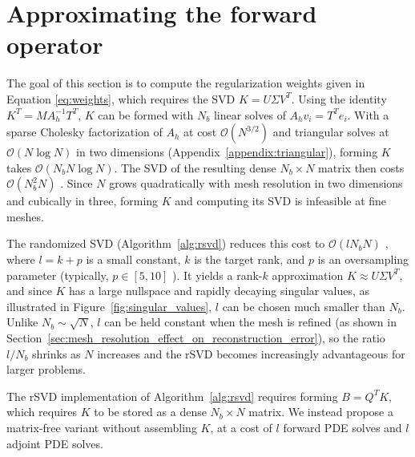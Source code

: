 \section{Approximating the forward operator}\label{sec:approximating}

The goal of this section is to compute the regularization weights given in Equation \eqref{eq:weights}, which requires the SVD $K = U\Sigma V^T$. Using the identity $K^T = MA_h^{-1}T^T$, $K$ can be formed with $N_b$ linear solves of $A_h v_i = T^T e_i$. With a sparse Cholesky factorization of $A_h$ at cost $\mathcal{O}(N^{3/2})$ and triangular solves at $\mathcal{O}(N \log N)$ in two dimensions (Appendix~\ref{appendix:triangular}), forming $K$ takes $\mathcal{O}(N_b N \log N)$. The SVD of the resulting dense $N_b \times N$ matrix then costs $\mathcal{O}(N_b^2 N)$ \cite{dongarraSingularValueDecomposition2018}. Since $N$ grows quadratically with mesh resolution in two dimensions and cubically in three, forming $K$ and computing its SVD is infeasible at fine meshes.

The randomized SVD (Algorithm~\ref{alg:rsvd}) reduces this cost to $\mathcal{O}(l N_b N)$ \cite{halkoFindingStructureRandomness2011}, where $l = k + p$ is a small constant, $k$ is the target rank, and $p$ is an oversampling parameter (typically, $p \in [5, 10]$ \cite{halkoFindingStructureRandomness2011}). It yields a rank-$k$ approximation $K \approx U \Sigma V^T$, and since $K$ has a large nullspace and rapidly decaying singular values, as illustrated in Figure~\ref{fig:singular_values}, $l$ can be chosen much smaller than $N_b$. Unlike $N_b \sim \sqrt{N}$, $l$ can be held constant when the mesh is refined (as shown in Section~\ref{sec:mesh_resolution_effect_on_reconstruction_error}), so the ratio $l / N_b$ shrinks as $N$ increases and the rSVD becomes increasingly advantageous for larger problems.

The rSVD implementation of Algorithm~\ref{alg:rsvd} requires forming $B = Q^T K$, which requires $K$ to be stored as a dense $N_b \times N$ matrix. We instead propose a matrix-free variant without assembling $K$, at a cost of $l$ forward PDE solves and $l$ adjoint PDE solves.


